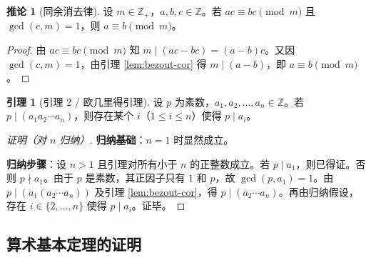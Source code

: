 \documentclass[UTF8,11pt,a4paper]{ctexbook}   %
\theoremstyle{definition}
\newtheorem{corollary}{推论}[section]
\newtheorem{lemma}{引理}[section]
\begin{document}
\begin{corollary}[同余消去律]
设 $m\in\mathbb{Z}_+$，$a,b,c\in\mathbb{Z}$。若 $ac\equiv bc\pmod{m}$ 且 $\gcd(c,m)=1$，则 $a\equiv b\pmod{m}$。
\end{corollary}

\begin{proof}
由 $ac\equiv bc\pmod{m}$ 知 $m\mid(ac-bc)=(a-b)c$。又因 $\gcd(c,m)=1$，由引理 \ref{lem:bezout-cor} 得 $m\mid(a-b)$，即 $a\equiv b\pmod{m}$。
\end{proof}

\begin{lemma}[引理 2 / 欧几里得引理]\label{lem:euclid-lemma}
设 $p$ 为素数，$a_1,a_2,\dots,a_n\in\mathbb{Z}$。若 $p\mid(a_1a_2\cdots a_n)$，则存在某个 $i$（$1\le i\le n$）使得 $p\mid a_i$。
\end{lemma}

\begin{proof}[证明（对 $n$ 归纳）]
\textbf{归纳基础}：$n=1$ 时显然成立。

\textbf{归纳步骤}：设 $n>1$ 且引理对所有小于 $n$ 的正整数成立。若 $p\mid a_1$，则已得证。否则 $p\nmid a_1$。由于 $p$ 是素数，其正因子只有 $1$ 和 $p$，故 $\gcd(p,a_1)=1$。由 $p\mid(a_1(a_2\cdots a_n))$ 及引理 \ref{lem:bezout-cor}，得 $p\mid(a_2\cdots a_n)$。再由归纳假设，存在 $i\in\{2,\dots,n\}$ 使得 $p\mid a_i$。证毕。
\end{proof}

\subsection{算术基本定理的证明}
\end{document}
